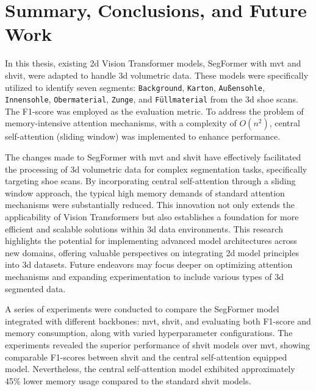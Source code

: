 \chapter{Summary, Conclusions, and Future Work}
\glsresetall
In this thesis, existing \gls{2d} Vision Transformer models, SegFormer with \gls{mvt} and \gls{shvit}, were adapted to handle \gls{3d} volumetric data. These models were specifically utilized to identify seven segments: {\tt Background}, {\tt Karton}, {\tt Außensohle}, {\tt Innensohle}, {\tt Obermaterial}, {\tt Zunge}, and {\tt Füllmaterial} from the \gls{3d} shoe scans. The F1-score was employed as the evaluation metric. To address the problem of memory-intensive attention mechanisms, with a complexity of $O(n^2)$, central self-attention (sliding window) was implemented to enhance performance.

\bigskip

The changes made to SegFormer with \gls{mvt} and \gls{shvit} have effectively facilitated the processing of \gls{3d} volumetric data for complex segmentation tasks, specifically targeting shoe scans. By incorporating central self-attention through a sliding window approach, the typical high memory demands of standard attention mechanisms were substantially reduced. This innovation not only extends the applicability of Vision Transformers but also establishes a foundation for more efficient and scalable solutions within \gls{3d} data environments. This research highlights the potential for implementing advanced model architectures across new domains, offering valuable perspectives on integrating \gls{2d} model principles into \gls{3d} datasets. Future endeavors may focus deeper on optimizing attention mechanisms and expanding experimentation to include various types of \gls{3d} segmented data.

\medskip

A series of experiments were conducted to compare the SegFormer model integrated with different backbones: \gls{mvt}, \gls{shvit}, and  evaluating both F1-score and  memory consumption, along with varied hyperparameter configurations. The experiments revealed the superior performance of \gls{shvit} models over \gls{mvt}, showing comparable F1-scores between \gls{shvit} and the central self-attention equipped model. Nevertheless, the central self-attention model exhibited approximately 45\% lower memory usage compared to the standard \gls{shvit} models.

\medskip

